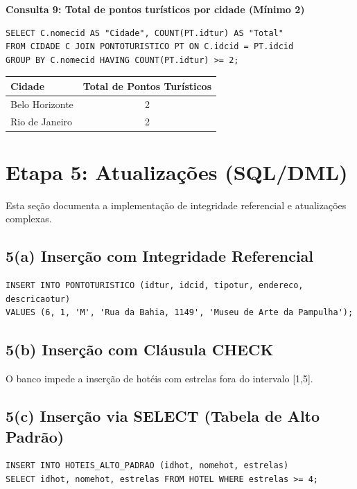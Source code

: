 \documentclass[11pt, a4paper]{article}
\begin{document}
\textbf{Consulta 9: Total de pontos turísticos por cidade (Mínimo 2)}
\begin{lstlisting}
SELECT C.nomecid AS "Cidade", COUNT(PT.idtur) AS "Total"
FROM CIDADE C JOIN PONTOTURISTICO PT ON C.idcid = PT.idcid
GROUP BY C.nomecid HAVING COUNT(PT.idtur) >= 2;
\end{lstlisting}

\begin{table}[h]
\centering
\begin{tabular}{lc}
\toprule
\textbf{Cidade} & \textbf{Total de Pontos Turísticos} \\
\midrule
Belo Horizonte & 2 \\
Rio de Janeiro & 2 \\
\bottomrule
\end{tabular}
\end{table}

\clearpage

\section{Etapa 5: Atualizações (SQL/DML)}

Esta seção documenta a implementação de integridade referencial e atualizações complexas.

\subsection{5(a) Inserção com Integridade Referencial}
\begin{lstlisting}
INSERT INTO PONTOTURISTICO (idtur, idcid, tipotur, endereco, descricaotur)
VALUES (6, 1, 'M', 'Rua da Bahia, 1149', 'Museu de Arte da Pampulha');
\end{lstlisting}

\subsection{5(b) Inserção com Cláusula CHECK}
O banco impede a inserção de hotéis com estrelas fora do intervalo [1,5].

\subsection{5(c) Inserção via SELECT (Tabela de Alto Padrão)}
\begin{lstlisting}
INSERT INTO HOTEIS_ALTO_PADRAO (idhot, nomehot, estrelas)
SELECT idhot, nomehot, estrelas FROM HOTEL WHERE estrelas >= 4;
\end{lstlisting}
\end{document}
